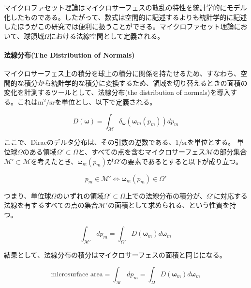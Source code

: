 \documentclass[a4j,xelatex,ja=standard]{bxjsarticle}
\begin{document}
マイクロファセット理論はマイクロサーフェスの散乱の特性を統計学的にモデル化したものである。したがって、数式は空間的に記述するよりも統計学的に記述したほうがこの研究では便利に扱うことができる。マイクロファセット理論において、球領域$\Omega$における法線空間として定義される。

\paragraph{法線分布(The Distribution of Normals)}

マイクロサーフェス上の積分を球上の積分に関係を持たせるため、すなわち、空間的な積分から統計学的な積分に変換するため、領域を切り替えるときの面積の変化を計測するツールとして、法線分布(the distribution of normals)を導入する。これは$\text{m}^2/\text{sr}$を単位とし、以下で定義される。

\begin{equation}
    D(\boldsymbol{\omega}) = \int_{\mathcal M}  \delta_{\boldsymbol{\omega}}(\boldsymbol{\omega}_m(p_m)) dp_m
    \label{eq:2}
\end{equation}

ここで、Diracのデルタ分布は、その引数の逆数である、$1/\text{sr}$を単位とする。
単位球$\Omega$のある領域$\Omega' \subset \Omega$と、すべての点を含むマイクロサーフェス$\mathcal M$の部分集合$\mathcal{M}' \subset \mathcal{M}$を考えたとき、$\boldsymbol{\omega}_m(p_m)$が$\Omega'$の要素であるとすると以下が成り立つ。

\begin{equation}
    p_m \in \mathcal{M}' \iff \boldsymbol{\omega}_m(p_m) \in \Omega'
    \label{eq:3}
\end{equation}

つまり、単位球$\Omega$のいずれの領域$\Omega' \subset \Omega$上での法線分布の積分が、$\Omega'$に対応する法線を有するすべての点の集合$\mathcal M'$の面積として求められる、という性質を持つ。

\begin{equation}
    \int_{\mathcal M'} dp_m = \int_{\Omega'} D(\boldsymbol{\omega}_m)d\boldsymbol{\omega}_m
    \label{eq:4}
\end{equation}

結果として、法線分布の積分はマイクロサーフェスの面積と同じになる。

\begin{equation}
    \text{microsurface area} = \int_{\mathcal M} dp_m = \int_{\Omega} D(\boldsymbol{\omega}_m)d\boldsymbol{\omega}_m
    \label{eq:5}
\end{equation}
\end{document}
